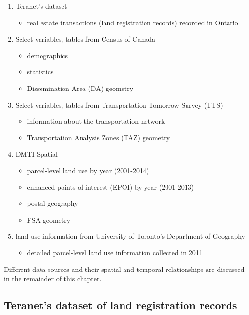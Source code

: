 \begin{enumerate}
    \item Teranet's dataset
    \begin{itemize}
        \item real estate transactions (land registration records) recorded in Ontario
    \end{itemize}
    \item Select variables, tables from Census of Canada
    \begin{itemize}
        \item demographics
        \item statistics
        \item Dissemination Area (DA) geometry
    \end{itemize}
    \item Select variables, tables from Transportation Tomorrow Survey (TTS)
    \begin{itemize}
        \item information about the transportation network
        \item Transportation Analysis Zones (TAZ) geometry
    \end{itemize}
    \item DMTI Spatial
    \begin{itemize}
        \item parcel-level land use by year (2001-2014)
        \item enhanced points of interest (EPOI) by year (2001-2013)
        \item postal geography
        \item FSA geometry
    \end{itemize}
    \item land use information from University of Toronto's Department of Geography
    \begin{itemize}
        \item detailed parcel-level land use information collected in 2011
    \end{itemize}
\end{enumerate}

Different data sources and their spatial and temporal relationships are discussed in the remainder of this chapter.

\subsection{Teranet's dataset of land registration records} \label{subsec:teranet_description}

